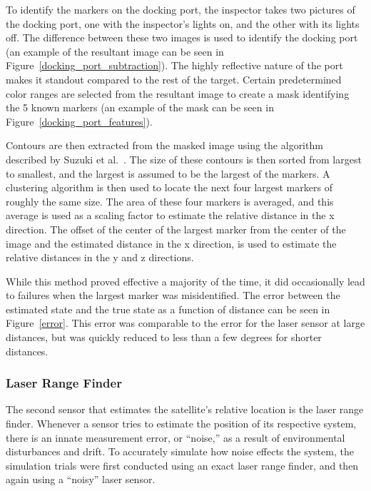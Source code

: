 \documentclass[journal, 10pt]{IEEEtran}
\begin{document}
To identify the markers on the docking port, the inspector takes two pictures of the docking port, one with the inspector's lights on, and the other with its lights off. The difference between these two images is used to identify the docking port (an example of the resultant image can be seen in Figure~\ref{docking_port_subtraction}). The highly reflective nature of the port makes it standout compared to the rest of the target. Certain predetermined color ranges are selected from the resultant image to create a mask identifying the 5 known markers (an example of the mask can be seen in Figure~\ref{docking_port_features}).

Contours are then extracted from the masked image using the algorithm described by Suzuki et al.~\cite{suzuki1985topological}. The size of these contours is then sorted from largest to smallest, and the largest is assumed to be the largest of the markers. A clustering algorithm is then used to locate the next four largest markers of roughly the same size. The area of these four markers is averaged, and this average is used as a scaling factor to estimate the relative distance in the x direction. The offset of the center of the largest marker from the center of the image and the estimated distance in the x direction, is used to estimate the relative distances in the y and z directions.

While this method proved effective a majority of the time, it did occasionally lead to failures when the largest marker was misidentified. The error between the estimated state and the true state as a function of distance can be seen in Figure~\ref{error}. This error was comparable to the error for the laser sensor at large distances, but was quickly reduced to less than a few degrees for shorter distances.

\subsubsection{Laser Range Finder} \label{laser}
The second sensor that estimates the satellite's relative location is the laser range finder. Whenever a sensor tries to estimate the position of its respective system, there is an innate measurement error, or ``noise,'' as a result of environmental disturbances and drift. To accurately simulate how noise effects the system, the simulation trials were first conducted using an exact laser range finder, and then again using a ``noisy'' laser sensor. 
\end{document}
